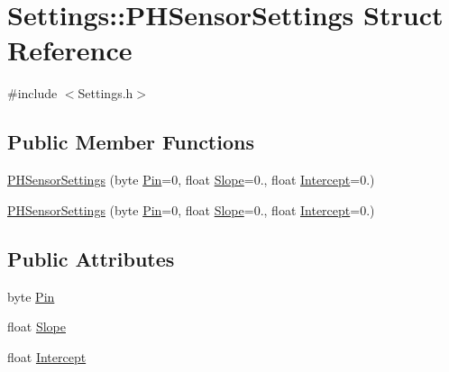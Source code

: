 \hypertarget{struct_settings_1_1_p_h_sensor_settings}{}\section{Settings\+:\+:P\+H\+Sensor\+Settings Struct Reference}
\label{struct_settings_1_1_p_h_sensor_settings}


{\ttfamily \#include $<$Settings.\+h$>$}

\subsection*{Public Member Functions}
\begin{DoxyCompactItemize}
\item 
\hyperlink{struct_settings_1_1_p_h_sensor_settings_a66c42aba152d8d898a5cbc9a53cb4799}{P\+H\+Sensor\+Settings} (byte \hyperlink{struct_settings_1_1_p_h_sensor_settings_ae56a6d50b61e4f561a352be8a215ec1a}{Pin}=0, float \hyperlink{struct_settings_1_1_p_h_sensor_settings_aca73249a393a8b9ee26e6f2b650386b3}{Slope}=0., float \hyperlink{struct_settings_1_1_p_h_sensor_settings_a7978fc33b0646c783bb389664c0b619a}{Intercept}=0.)
\item 
\hyperlink{struct_settings_1_1_p_h_sensor_settings_a66c42aba152d8d898a5cbc9a53cb4799}{P\+H\+Sensor\+Settings} (byte \hyperlink{struct_settings_1_1_p_h_sensor_settings_ae56a6d50b61e4f561a352be8a215ec1a}{Pin}=0, float \hyperlink{struct_settings_1_1_p_h_sensor_settings_aca73249a393a8b9ee26e6f2b650386b3}{Slope}=0., float \hyperlink{struct_settings_1_1_p_h_sensor_settings_a7978fc33b0646c783bb389664c0b619a}{Intercept}=0.)
\end{DoxyCompactItemize}
\subsection*{Public Attributes}
\begin{DoxyCompactItemize}
\item 
byte \hyperlink{struct_settings_1_1_p_h_sensor_settings_ae56a6d50b61e4f561a352be8a215ec1a}{Pin}
\item 
float \hyperlink{struct_settings_1_1_p_h_sensor_settings_aca73249a393a8b9ee26e6f2b650386b3}{Slope}
\item 
float \hyperlink{struct_settings_1_1_p_h_sensor_settings_a7978fc33b0646c783bb389664c0b619a}{Intercept}
\end{DoxyCompactItemize}


